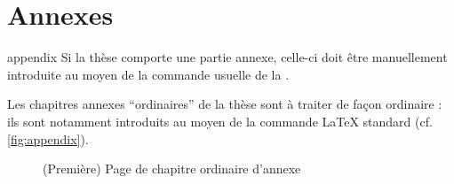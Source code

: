 \chapter{Annexes}\label{cha:annexes}

\begin{docCommand}{appendix}{}
  Si la thèse comporte une partie annexe, celle-ci doit être manuellement
  introduite au moyen de la commande usuelle  de la
  \nofrontmatter.
\end{docCommand}

Les chapitres annexes \enquote{ordinaires} de la thèse sont à
traiter de façon ordinaire : ils sont notamment introduits au moyen
de la commande \LaTeX{} standard  (cf.
\vref{fig:appendix}).

\begin{figure}[htbp]
  \centering
    \caption[Chapitre ordinaire d'annexe]{(Première) Page de chapitre
      ordinaire d'annexe}
  \label{fig:appendix}
\end{figure}

%
\iffalse
\fi
